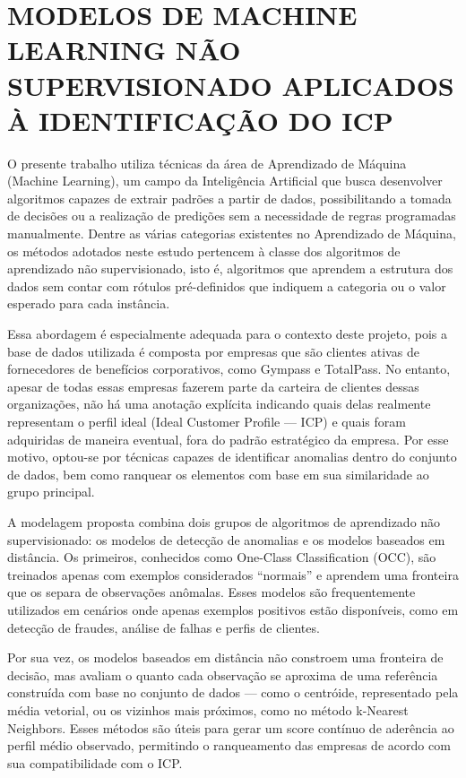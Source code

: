 \section{MODELOS DE MACHINE LEARNING NÃO SUPERVISIONADO APLICADOS À IDENTIFICAÇÃO DO ICP}

O presente trabalho utiliza técnicas da área de Aprendizado de Máquina (Machine Learning), um campo da Inteligência Artificial que busca desenvolver algoritmos capazes de extrair padrões a partir de dados, possibilitando a tomada de decisões ou a realização de predições sem a necessidade de regras programadas manualmente. Dentre as várias categorias existentes no Aprendizado de Máquina, os métodos adotados neste estudo pertencem à classe dos algoritmos de aprendizado não supervisionado, isto é, algoritmos que aprendem a estrutura dos dados sem contar com rótulos pré-definidos que indiquem a categoria ou o valor esperado para cada instância.

Essa abordagem é especialmente adequada para o contexto deste projeto, pois a base de dados utilizada é composta por empresas que são clientes ativas de fornecedores de benefícios corporativos, como Gympass e TotalPass. No entanto, apesar de todas essas empresas fazerem parte da carteira de clientes dessas organizações, não há uma anotação explícita indicando quais delas realmente representam o perfil ideal (Ideal Customer Profile — ICP) e quais foram adquiridas de maneira eventual, fora do padrão estratégico da empresa. Por esse motivo, optou-se por técnicas capazes de identificar anomalias dentro do conjunto de dados, bem como ranquear os elementos com base em sua similaridade ao grupo principal.

A modelagem proposta combina dois grupos de algoritmos de aprendizado não supervisionado: os modelos de detecção de anomalias e os modelos baseados em distância. Os primeiros, conhecidos como One-Class Classification (OCC), são treinados apenas com exemplos considerados “normais” e aprendem uma fronteira que os separa de observações anômalas. Esses modelos são frequentemente utilizados em cenários onde apenas exemplos positivos estão disponíveis, como em detecção de fraudes, análise de falhas e perfis de clientes. 

Por sua vez, os modelos baseados em distância não constroem uma fronteira de decisão, mas avaliam o quanto cada observação se aproxima de uma referência construída com base no conjunto de dados — como o centróide, representado pela média vetorial, ou os vizinhos mais próximos, como no método k-Nearest Neighbors. Esses métodos são úteis para gerar um score contínuo de aderência ao perfil médio observado, permitindo o ranqueamento das empresas de acordo com sua compatibilidade com o ICP.

